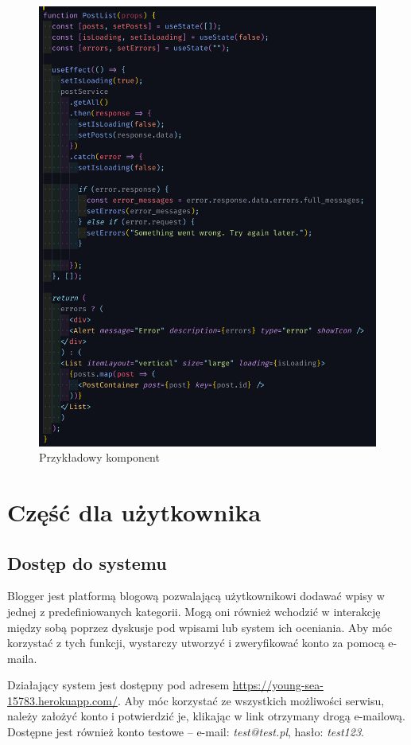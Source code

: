 \documentclass[declaration,shortabstract,polish,inz]{iithesis}
\begin{document}
\begin{figure}
    \centering
    \includegraphics[width=\textwidth]{images/komponent1.png}
    \caption{Przykładowy komponent}
    \label{fig:komponent1}
\end{figure}

\chapter{Część dla użytkownika}
\section{Dostęp do systemu}
Blogger jest platformą blogową pozwalającą użytkownikowi dodawać wpisy w jednej z predefiniowanych kategorii. Mogą oni również wchodzić w interakcję między sobą poprzez dyskusje pod wpisami lub system ich oceniania. Aby móc korzystać z tych funkcji, wystarczy utworzyć i zweryfikować konto za pomocą e-maila.

Działający system jest dostępny pod adresem \url{https://young-sea-15783.herokuapp.com/}. Aby móc korzystać ze wszystkich możliwości serwisu, należy założyć konto i potwierdzić je, klikając w link otrzymany drogą e-mailową. Dostępne jest również konto testowe – e-mail: \textit{test@test.pl}, hasło: \textit{test123}.
\end{document}
